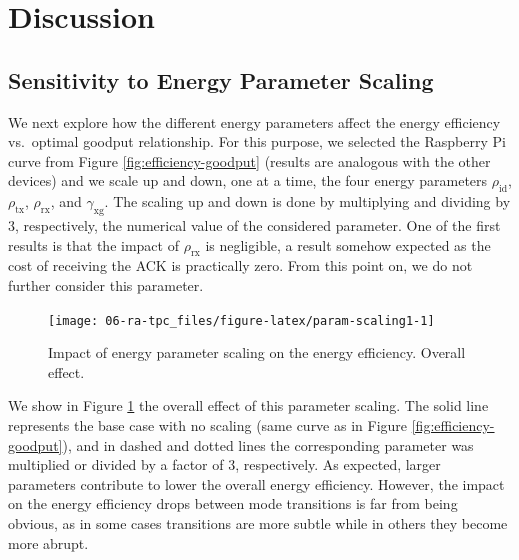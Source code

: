 \documentclass[twoside,nohyper]{tufte-book}
\theoremstyle{definition}
\theoremstyle{definition}
\theoremstyle{definition}
\theoremstyle{remark}
\begin{document}
\hypertarget{discussion}{%
\section{Discussion}\label{discussion}}

\hypertarget{sensitivity-to-energy-parameter-scaling}{%
\subsection{Sensitivity to Energy Parameter
Scaling}\label{sensitivity-to-energy-parameter-scaling}}

We next explore how the different energy parameters affect the energy
efficiency vs.~optimal goodput relationship. For this purpose, we
selected the Raspberry Pi curve from Figure \ref{fig:efficiency-goodput}
(results are analogous with the other devices) and we scale up and down,
one at a time, the four energy parameters \(\rho_\mathrm{id}\),
\(\rho_\mathrm{tx}\), \(\rho_\mathrm{rx}\), and \(\gamma_\mathrm{xg}\).
The scaling up and down is done by multiplying and dividing by 3,
respectively, the numerical value of the considered parameter. One of
the first results is that the impact of \(\rho_\mathrm{rx}\) is
negligible, a result somehow expected as the cost of receiving the ACK
is practically zero. From this point on, we do not further consider this
parameter.




\begin{figure}

{\centering \texttt{[image: 06-ra-tpc\_files/figure-latex/param-scaling1-1]} 

}

\caption[Impact of energy parameter scaling on the energy
efficiency. Overall effect.]{Impact of energy parameter scaling on the energy
efficiency. Overall effect.}\label{fig:param-scaling1}
\end{figure}

We show in Figure \ref{fig:param-scaling1} the overall effect of this
parameter scaling. The solid line represents the base case with no
scaling (same curve as in Figure \ref{fig:efficiency-goodput}), and in
dashed and dotted lines the corresponding parameter was multiplied or
divided by a factor of 3, respectively. As expected, larger parameters
contribute to lower the overall energy efficiency. However, the impact
on the energy efficiency drops between mode transitions is far from
being obvious, as in some cases transitions are more subtle while in
others they become more abrupt.
\end{document}
